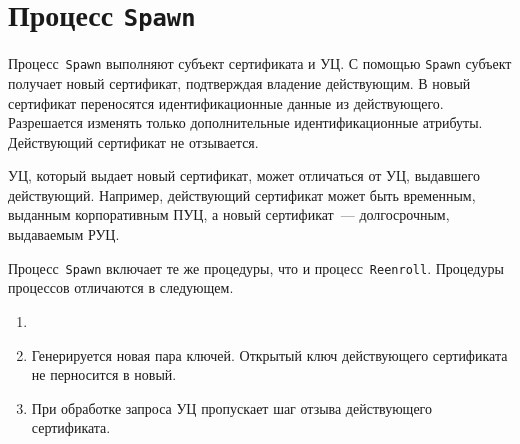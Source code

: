 \section{Процесс \texttt{Spawn}}\label{PROCESSES.Spawn}

Процесс~\texttt{Spawn} выполняют субъект сертификата и УЦ. 
С помощью \texttt{Spawn} субъект получает новый сертификат,
подтверждая владение действующим. В новый сертификат переносятся   
идентификационные данные из действующего. Разрешается изменять 
только дополнительные идентификационные атрибуты. Действующий 
сертификат не отзывается.

УЦ, который выдает новый сертификат, может отличаться от УЦ, выдавшего 
действующий. Например, действующий сертификат может быть временным, 
выданным корпоративным ПУЦ, а новый сертификат~--- долгосрочным,
выдаваемым РУЦ.

Процесс~\texttt{Spawn} включает те же процедуры, что и
процесс~\texttt{Reenroll}. Процедуры процессов отличаются в следующем.

\begin{enumerate}
\item
{}
\item
Генерируется новая пара ключей. Открытый ключ действующего сертификата
не перносится в новый.
\item
При обработке запроса УЦ пропускает шаг отзыва действующего сертификата. 
\end{enumerate}


